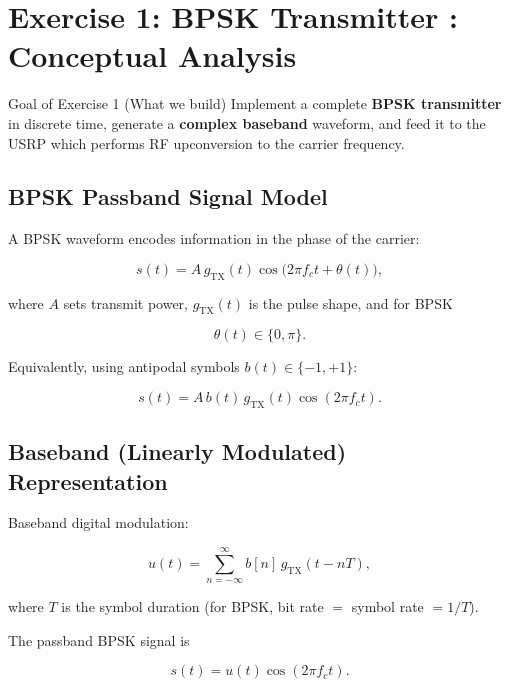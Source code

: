 \section{Exercise 1: BPSK Transmitter : Conceptual Analysis}
\label{sec:ex1-analysis}

\begin{GoalBox}{Goal of Exercise 1 (What we build)}
Implement a complete \textbf{BPSK transmitter} in discrete time, generate a \textbf{complex baseband} waveform, and feed it to the USRP which performs RF upconversion to the carrier frequency.
\end{GoalBox}

\subsection{BPSK Passband Signal Model}

A BPSK waveform encodes information in the phase of the carrier:

\begin{equation}
s(t)=A\,g_{\text{TX}}(t)\cos\!\big(2\pi f_c t+\theta(t)\big),
\end{equation}

where $A$ sets transmit power, $g_{\text{TX}}(t)$ is the pulse shape, and for BPSK

\begin{equation}
\theta(t)\in\{0,\pi\}.
\end{equation}

Equivalently, using antipodal symbols $b(t)\in\{-1,+1\}$:

\begin{equation}
s(t)=A\,b(t)\,g_{\text{TX}}(t)\cos(2\pi f_c t).
\end{equation}

\subsection{Baseband (Linearly Modulated) Representation}

Baseband digital modulation:

\begin{equation}
u(t)=\sum_{n=-\infty}^{\infty} b[n]\,g_{\text{TX}}(t-nT),
\label{eq:linear_mod}
\end{equation}

where $T$ is the symbol duration (for BPSK, bit rate $=$ symbol rate $=1/T$).

The passband BPSK signal is

\begin{equation}
s(t)=u(t)\cos(2\pi f_c t).
\end{equation}

